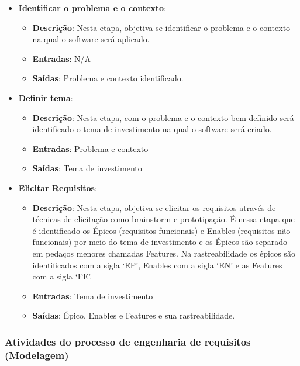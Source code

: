 \begin{itemize}
  \item \textbf{Identificar o problema e o contexto}:
  \begin{itemize}
    \item \textbf{Descrição}: Nesta etapa, objetiva-se identificar o problema e o contexto na qual o software será aplicado.
    \item \textbf{Entradas}: N/A
    \item \textbf{Saídas}: Problema e contexto identificado.
  \end{itemize}
  \item \textbf{Definir tema}:
  \begin{itemize}
    \item \textbf{Descrição}: Nesta etapa, com o problema e o contexto bem definido será identificado o tema
      de investimento na qual o software será criado.
    \item \textbf{Entradas}: Problema e contexto
    \item \textbf{Saídas}: Tema de investimento
  \end{itemize}
  \item \textbf{Elicitar Requisitos}:
  \begin{itemize}
    \item \textbf{Descrição}: Nesta etapa, objetiva-se elicitar os requisitos através de técnicas de elicitação
      como brainstorm e prototipação. É nessa etapa que é identificado os Épicos (requisitos funcionais) e
      Enables (requisitos não funcionais) por meio do tema de investimento e os Épicos são separado em pedaços
      menores chamadas Features. Na rastreabilidade os épicos são identificados com a sigla ‘EP’, Enables com a
      sigla ‘EN’ e as Features com a sigla ‘FE’.
    \item \textbf{Entradas}: Tema de investimento
    \item \textbf{Saídas}: Épico, Enables e Features e sua rastreabilidade.
  \end{itemize}
\end{itemize}

\subsubsection{Atividades do processo de engenharia de requisitos (Modelagem)}

